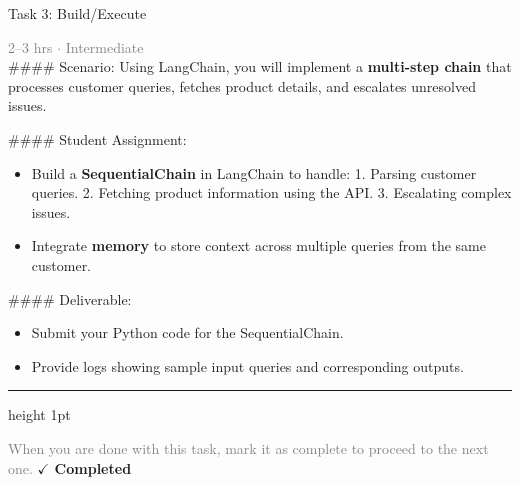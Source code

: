 \documentclass[10pt,a4paper]{article}
\begin{document}
\begin{taskbox}{Task 3: Build/Execute}

    {\small \textcolor{gray}{2--3 hrs $\cdot$ Intermediate}}\\[12pt]

    \#\#\#\# Scenario:
Using LangChain, you will implement a \textbf{multi-step chain} that processes customer queries, fetches product details, and escalates unresolved issues.

\#\#\#\# Student Assignment:
\begin{itemize}
    \item Build a \textbf{SequentialChain} in LangChain to handle:
  1. Parsing customer queries.
  2. Fetching product information using the API.
  3. Escalating complex issues.
    \item Integrate \textbf{memory} to store context across multiple queries from the same customer.
\end{itemize}

\#\#\#\# Deliverable:
\begin{itemize}
    \item Submit your Python code for the SequentialChain.
    \item Provide logs showing sample input queries and corresponding outputs.\par
\end{itemize}

    \vspace{16pt}

    \textcolor{cardBorder}{\hrule height 1pt}\vspace{8pt}

    \small \textcolor{gray}{When you are done with this task, mark it as complete to proceed to the next one.} \hfill \textbf{\textcolor{brandDark}{$\checkmark$ Completed}}

\end{taskbox}
\end{document}
